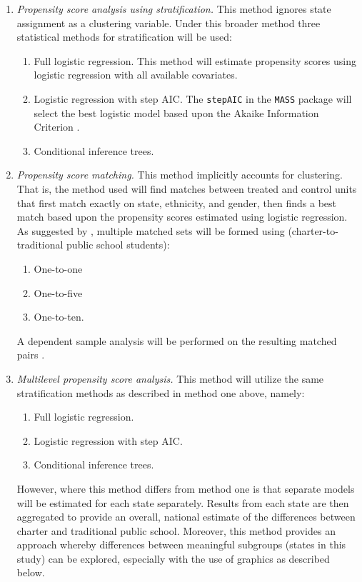 \documentclass[letterpaper,12pt]{article}
\begin{document}
\begin{enumerate}
	\item \textit{Propensity score analysis using stratification.} This method ignores state assignment as a clustering variable. Under this broader method three statistical methods for stratification will be used:
		\begin{enumerate}
			\item Full logistic regression. This method will estimate propensity scores using logistic regression with all available covariates.
			\item Logistic regression with step AIC. The \texttt{stepAIC} in the \texttt{MASS} package \cite{mass} will select the best logistic model based upon the Akaike Information Criterion \cite{Akaike1974}. 
			\item Conditional inference trees.
		\end{enumerate}
	\item \textit{Propensity score matching.} This method implicitly accounts for clustering. That is, the method used will find matches between treated and control units that first match exactly on state, ethnicity, and gender, then finds a best match based upon the propensity scores estimated using logistic regression. As suggested by , multiple matched sets will be formed using (charter-to-traditional public school students):
		\begin{enumerate}
			\item One-to-one
			\item One-to-five
			\item One-to-ten.
		\end{enumerate}
		A dependent sample analysis will be performed on the resulting matched pairs \cite{Austin2011}.
	\item \textit{Multilevel propensity score analysis.} This method will utilize the same stratification methods as described in method one above, namely:
		\begin{enumerate}
			\item Full logistic regression.
			\item Logistic regression with step AIC.
			\item Conditional inference trees.
		\end{enumerate}
	However, where this method differs from method one is that separate models will be estimated for each state separately. Results from each state are then aggregated to provide an overall, national estimate of the differences between charter and traditional public school. Moreover, this method provides an approach whereby differences between meaningful subgroups (states in this study) can be explored, especially with the use of graphics as described below.
\end{enumerate}
\end{document}
